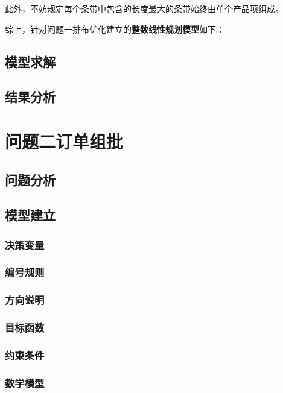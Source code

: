\documentclass[bwprint]{gmcmthesis}
\begin{document}
此外，不妨规定每个条带中包含的长度最大的条带始终由单个产品项组成。



综上，针对问题一排布优化建立的\textbf{整数线性规划模型}如下：

\subsection{模型求解}

\subsection{结果分析}

\section{问题二订单组批}

\subsection{问题分析}

\subsection{模型建立}

\subsubsection{决策变量}

\subsubsection{编号规则}

\subsubsection{方向说明}

\subsubsection{目标函数}

\subsubsection{约束条件}

\subsubsection{数学模型}
\end{document}
